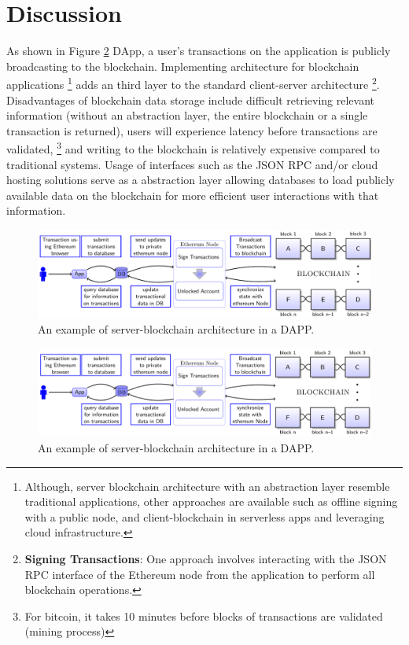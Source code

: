 	
\section{Discussion}
As shown in 
		Figure \ref{fig:DApp} \gls{DApp}, a user's transactions on the application is publicly broadcasting to the blockchain. 
		Implementing architecture for blockchain applications \footnote{Although, server blockchain architecture with an abstraction layer resemble traditional applications, other approaches are available such as offline signing with a public node, and client-blockchain in serverless apps and leveraging cloud infrastructure.} adds an third layer to the standard client-server architecture 	\footnote{ \textbf{Signing Transactions}: One approach involves interacting with the JSON RPC interface of the \gls{Ethereum} node from the application to perform all blockchain operations.}.
		 Disadvantages of blockchain data storage include difficult retrieving relevant information (without an abstraction layer, the entire blockchain or a single transaction is returned), users will experience latency before transactions are validated, 	\footnote{For bitcoin, it takes 10 minutes before blocks of transactions are validated (mining process)} and writing to the blockchain is relatively expensive compared to traditional systems. Usage of interfaces such as the JSON RPC and/or cloud hosting 
	 solutions serve as a abstraction layer allowing databases to load publicly available data on the blockchain
	 	 for more efficient user interactions with that information. 

\begin{warpprint}
\begin{figure}[ht]
\begin{adjustbox}{center,max width=1.1\textwidth}
\includegraphics[width=1.2\linewidth]{Diagrams/blockchainInSimpleApp.pdf}
\end{adjustbox}
\caption{An example of server-blockchain architecture in a DAPP.}
\label{fig:DApp}
\end{figure}
\end{warpprint}

\begin{warpHTML}
\begin{figure}[ht]
\includegraphics[width=1.2\linewidth]{Diagrams/blockchainInSimpleApp.svg}
\caption{An example of server-blockchain architecture in a DAPP.}
\label{fig:DApp}
\end{figure}
\end{warpHTML}

